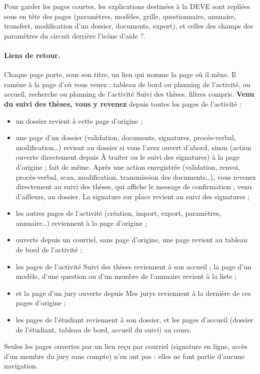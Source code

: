 \documentclass[11pt,a4paper]{article}
\begin{document}
Pour garder les pages courtes, les explications destinées à la DEVE sont
repliées sous  en tête des pages (paramètres, modèles, grille,
questionnaire, annuaire, transfert, modification d'un dossier, documents,
export), et celles des champs des paramètres du circuit derrière l'icône
d'aide \og ?\fg{}.

\paragraph{Liens de retour.} Chaque page porte, sous son titre, un lien
 qui nomme la page où il mène. Il ramène à la page
d'où vous venez : tableau de bord ou planning de l'activité, ou accueil,
recherche ou planning de l'activité \og Suivi des thèses\fg{}, filtres
compris. \textbf{Venu du suivi des thèses, vous y revenez} depuis toutes les
pages de l'activité :
\begin{itemize}
  \item un dossier revient à cette page d'origine ;
  \item une page d'un dossier (validation, documents, signatures, procès-verbal,
        modification\ldots) revient au dossier si vous l'avez ouvert d'abord,
        sinon (action ouverte directement depuis \og À traiter\fg{} ou le suivi
        des signatures) à la page d'origine ;  fait de même.
        Après une action enregistrée (validation, renvoi, procès-verbal,
        scan, modification, transmission des documents\ldots), vous revenez
        directement au suivi des thèses, qui affiche le message de
        confirmation ; venu d'ailleurs, au dossier. La signature sur place
        revient au suivi des signatures ;
  \item les autres pages de l'activité (création, import, export, paramètres,
        annuaire\ldots) reviennent à la page d'origine ;
  \item ouverte depuis un courriel, sans page d'origine, une page revient au
        tableau de bord de l'activité ;
  \item les pages de l'activité \og Suivi des thèses\fg{} reviennent à son
        accueil ; la page d'un modèle, d'une question ou d'un membre de
        l'annuaire revient à la liste ;
  \item {} et la page d'un jury ouverte depuis \og Mes
        jurys\fg{} reviennent à la dernière de ces pages d'origine ;
  \item les pages de l'étudiant reviennent à son dossier, et les pages
        d'accueil (dossier de l'étudiant, tableau de bord, accueil du suivi) au
        cours.
\end{itemize}
Seules les pages ouvertes par un lien reçu par courriel (signature en ligne,
accès d'un membre du jury sans compte) n'en ont pas : elles ne font partie
d'aucune navigation.
\end{document}
